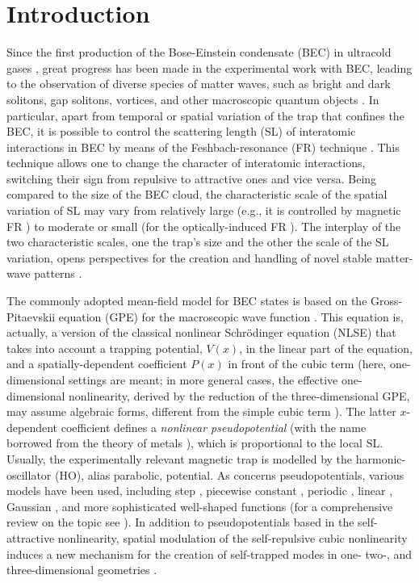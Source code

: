 \documentclass[aps,preprint,showkeys,
]{revtex4}
\begin{document}
\graphicspath{ {images/} } %

\section{Introduction}

Since the first production of the Bose-Einstein condensate (BEC) in
ultracold gases \cite{AEMWC95,DMADDKK95,BSTH95}, great progress has been
made in the experimental work with BEC, leading to the observation of
diverse species of matter waves, such as bright and dark solitons, gap
solitons, vortices, and other macroscopic quantum objects \cite{Romanian}.
In particular, apart from temporal or spatial variation of the trap that
confines the BEC, it is possible to control the scattering length (SL) of
interatomic interactions in BEC by means of the Feshbach-resonance (FR)
technique \cite{I98,TT04,KGJ06}. This technique allows one to change the
character of interatomic interactions, switching their sign from repulsive
to attractive ones and vice versa. Being compared to the size of the BEC
cloud, the characteristic scale of the spatial variation of SL may vary from
relatively large (e.g., it is controlled by magnetic FR \cite{Hannaford}) to
moderate or small (for the optically-induced FR \cite{Japan,Cs}). The
interplay of the two characteristic scales, one the trap's size and the
other the scale of the SL variation, opens perspectives for the creation and
handling of novel stable matter-wave patterns \cite{HS}.

The commonly adopted mean-field model for BEC states is based on the
Gross-Pitaevskii equation (GPE) for the macroscopic wave function \cite%
{Pet,Pit}. This equation is, actually, a version of the classical nonlinear
Schr\"{o}dinger equation (NLSE) that takes into account a trapping
potential, $V(x)$, in the linear part of the equation, and a
spatially-dependent coefficient $P(x)$ in front of the cubic term (here,
one-dimensional settings are meant; in more general cases, the effective
one-dimensional nonlinearity, derived by the reduction of the
three-dimensional GPE, may assume algebraic forms, different from the simple
cubic term \cite{Salasnich,Delgado}). The latter $x$-dependent coefficient
defines a \textit{nonlinear pseudopotential }(with the name borrowed from
the theory of metals \cite{pseudo}), which is proportional to the local SL.
Usually, the experimentally relevant magnetic trap is modelled by the
harmonic-oscillator (HO), alias parabolic, potential. As concerns
pseudopotentials, various models have been used, including step \cite%
{ZAKP07,TAM16}, piecewise constant \cite{RKP08}, periodic \cite%
{SM05,WLK13,K17}, linear \cite{TSKF02}, Gaussian \cite{HY08}, and more
sophisticated well-shaped \cite{DM15} functions (for a comprehensive review
on the topic see \cite{KMT11}). In addition to pseudopotentials based in the
self-attractive nonlinearity, spatial modulation of the self-repulsive cubic
nonlinearity induces a new mechanism for the creation of self-trapped modes
in one- two-, and three-dimensional geometries \cite{Barcelona}.
\end{document}
